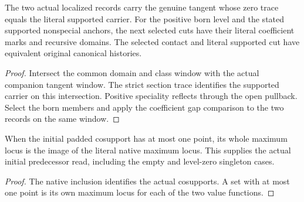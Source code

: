 \begin{theorem}
\label{hir:g1-localized-next-born-canonicality}
\leanok
The two actual localized records carry the genuine tangent
whose zero trace equals the literal supported carrier. For
the positive born level and the stated supported nonspecial
anchors, the next selected cuts have their literal coefficient
marks and recursive domains. The selected contact and literal
supported cut have equivalent original canonical histories.
\end{theorem}
\begin{proof}
Intersect the common domain and class window with the
actual companion tangent window. The strict section trace
identifies the supported carrier on this intersection.
Positive speciality reflects through the open pullback.
Select the born members and apply the coefficient gap
comparison to the two records on the same window.
\end{proof}

\begin{theorem}
\label{hir:g1-initial-small-support-native-read}
\leanok
When the initial padded cosupport has at most one point,
its whole maximum locus is the image of the literal native
maximum locus. This supplies the actual initial predecessor
read, including the empty and level-zero singleton cases.
\end{theorem}
\begin{proof}
The native inclusion identifies the actual cosupports. A
set with at most one point is its own maximum locus for
each of the two value functions.
\end{proof}

